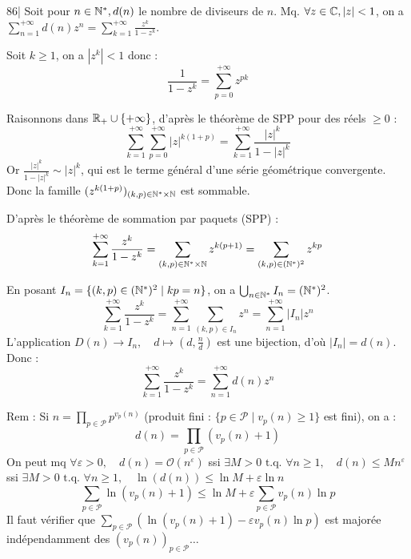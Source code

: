 
\begin{statementbox}
86| Soit pour $n \in \mathbb N^*, d(n)$ le nombre de diviseurs de $n$.
Mq. $\forall z \in \mathbb C, |z|<1$, on a $\sum_{n=1}^{+\infty} d(n)z^n = \sum_{k=1}^{+\infty} \frac{z^k}{1-z^k}$.
\end{statementbox}

\begin{solution}
Soit $k \geq 1$, on a $|z^k| < 1$ donc :
\[ \frac{1}{1-z^k} = \sum_{p=0}^{+\infty} z^{pk} \]

Raisonnons dans $\mathbb R_+ \cup \{+\infty\}$, d'après le théorème de SPP pour des réels $\geq 0$ :
\[ \sum_{k=1}^{+\infty} \sum_{p=0}^{+\infty} |z|^{k(1+p)} = \sum_{k=1}^{+\infty} \frac{|z|^k}{1-|z|^k} \]
Or $\frac{|z|^k}{1-|z|^k} \sim |z|^k$, qui est le terme général d'une série géométrique convergente.
Donc la famille $(z^{k(1+p)})_{(k,p)\in \mathbb N^* \times \mathbb N}$ est sommable.

D'après le théorème de sommation par paquets (SPP) :
\[ \sum_{k=1}^{+\infty} \frac{z^k}{1-z^k} = \sum_{(k,p)\in \mathbb N^* \times \mathbb N} z^{k(p+1)} = \sum_{(k,p)\in (\mathbb N^*)^2} z^{kp} \]

En posant $I_n = \{(k,p) \in (\mathbb N^*)^2 \mid kp = n\}$, on a $\bigcup_{n \in \mathbb N^*} I_n = (\mathbb N^*)^2$.
\[ \sum_{k=1}^{+\infty} \frac{z^k}{1-z^k} = \sum_{n=1}^{+\infty} \sum_{(k,p) \in I_n} z^n = \sum_{n=1}^{+\infty} |I_n| z^n \]
L'application $D(n) \to I_n, \quad d \mapsto \left(d, \frac{n}{d}\right)$ est une bijection, d'où $|I_n| = d(n)$.
Donc :
\[ \sum_{k=1}^{+\infty} \frac{z^k}{1-z^k} = \sum_{n=1}^{+\infty} d(n)z^n \]

\begin{remarkbox}
Rem : Si $n = \prod_{p \in \mathcal{P}} p^{v_p(n)}$ (produit fini : $\{p \in \mathcal{P} \mid v_p(n) \geq 1\}$ est fini), on a :
\[ d(n) = \prod_{p \in \mathcal{P}} (v_p(n) + 1) \]
On peut mq $\forall \varepsilon > 0, \quad d(n) = \mathcal{O}(n^\varepsilon)$
ssi $\exists M > 0 \text{ t.q. } \forall n \geq 1, \quad d(n) \leq M n^\varepsilon$
ssi $\exists M > 0 \text{ t.q. } \forall n \geq 1, \quad \ln(d(n)) \leq \ln M + \varepsilon \ln n$
\[ \sum_{p \in \mathcal{P}} \ln(v_p(n)+1) \leq \ln M + \varepsilon \sum_{p \in \mathcal{P}} v_p(n) \ln p \]
Il faut vérifier que $\sum_{p \in \mathcal{P}} (\ln(v_p(n)+1) - \varepsilon v_p(n) \ln p)$ est majorée indépendamment des $(v_p(n))_{p \in \mathcal{P}} \dots$
\end{remarkbox}
\end{solution}


